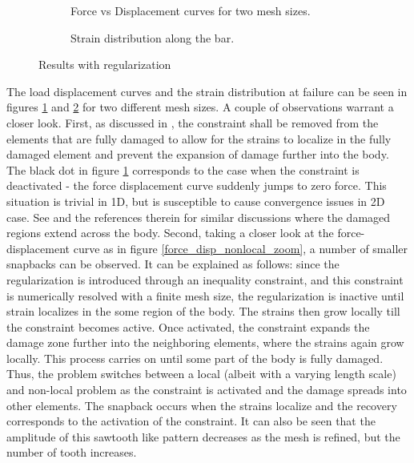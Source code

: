 \documentclass[10pt]{elsarticle}
\begin{document}
\begin{figure}[ht]
	\begin{subfigure}{0.45\textwidth}
		\centering
		
		\caption{Force vs Displacement curves for two mesh sizes.}
		\label{force_disp_nonlocal}
	\end{subfigure}
	\hfill
	\begin{subfigure}{0.45\textwidth}
		\centering
		
		\caption{Strain distribution along the bar.}
		\label{strain_dist_nonlocal}
	\end{subfigure}
	\caption{Results with regularization}
	\label{fig:Results_with_regularization}
\end{figure}

The load displacement curves and the strain distribution at failure can be seen in figures \ref{force_disp_nonlocal} and \ref{strain_dist_nonlocal} for two different mesh sizes. A couple of observations warrant a closer look. First, as discussed in \cite{Kamasamudram2023}, the constraint shall be removed from the elements that are fully damaged to allow for the strains to localize in the fully damaged element and prevent the expansion of damage further into the body. The black dot in figure \ref{force_disp_nonlocal} corresponds to the case when the constraint is deactivated - the force displacement curve suddenly jumps to zero force. This situation is trivial in 1D, but is susceptible to cause convergence issues in 2D case. See \cite{Geers1998,Cabot2014,Le2018} and the references therein for similar discussions where the damaged regions extend across the body. Second, taking a closer look at the force-displacement curve as in figure \ref{force_disp_nonlocal_zoom}, a number of smaller snapbacks can be observed. It can be explained as follows: since the regularization is introduced through an inequality constraint, and this constraint is numerically resolved with a finite mesh size, the regularization is inactive until strain localizes in the some region of the body. The strains then grow locally till the constraint becomes active. Once activated, the constraint expands the damage zone further into the neighboring elements, where the strains again grow locally. This process carries on until some part of the body is fully damaged. Thus, the problem switches between a local (albeit with a varying length scale) and non-local problem as the constraint is activated and the damage spreads into other elements. The snapback occurs when the strains localize and the recovery corresponds to the activation of the constraint. It can also be seen that the amplitude of this sawtooth like pattern decreases as the mesh is refined, but the number of tooth increases.
\end{document}
